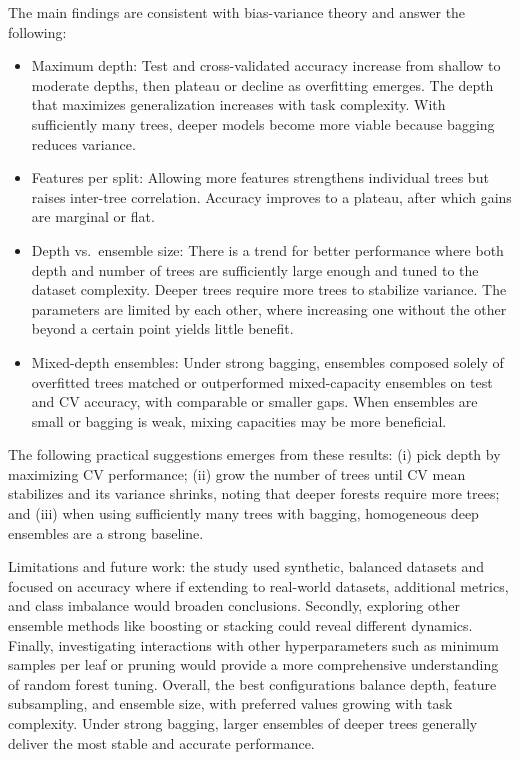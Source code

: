 \documentclass[conference]{IEEEtran}
\begin{document}
The main findings are consistent with bias-variance theory and answer the following:
\begin{itemize}
  \item Maximum depth: Test and cross-validated accuracy increase from shallow to moderate depths, then plateau or decline as overfitting emerges. The depth that maximizes generalization increases with task complexity. With sufficiently many trees, deeper models become more viable because bagging reduces variance.
  \item Features per split: Allowing more features strengthens individual trees but raises inter-tree correlation. Accuracy improves to a plateau, after which gains are marginal or flat.
  \item Depth vs.\ ensemble size: There is a trend for better performance where both depth and number of trees are sufficiently large enough and tuned to the dataset complexity. Deeper trees require more trees to stabilize variance. The parameters are limited by each other, where increasing one without the other beyond a certain point yields little benefit.
  \item Mixed-depth ensembles: Under strong bagging, ensembles composed solely of overfitted trees matched or outperformed mixed-capacity ensembles on test and CV accuracy, with comparable or smaller gaps. When ensembles are small or bagging is weak, mixing capacities may be more beneficial.
\end{itemize}

The following practical suggestions emerges from these results: (i) pick depth by maximizing CV performance; (ii) grow the number of trees until CV mean stabilizes and its variance shrinks, noting that deeper forests require more trees; and (iii) when using sufficiently many trees with bagging, homogeneous deep ensembles are a strong baseline.

Limitations and future work: the study used synthetic, balanced datasets and focused on accuracy where if extending to real-world datasets, additional metrics, and class imbalance would broaden conclusions. Secondly, exploring other ensemble methods like boosting or stacking could reveal different dynamics. Finally, investigating interactions with other hyperparameters such as minimum samples per leaf or pruning would provide a more comprehensive understanding of random forest tuning.
Overall, the best configurations balance depth, feature subsampling, and ensemble size, with preferred values growing with task complexity. Under strong bagging, larger ensembles of deeper trees generally deliver the most stable and accurate performance.
\end{document}
